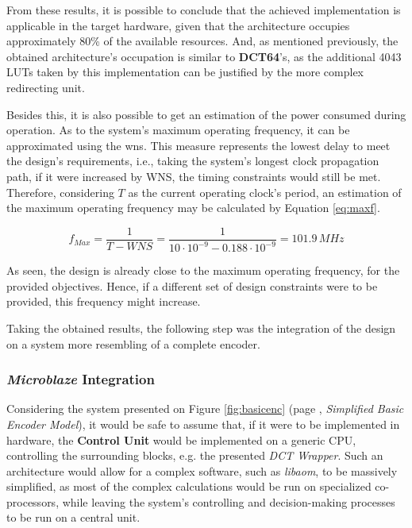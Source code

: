 From these results, it is possible to conclude that the achieved implementation is applicable in the target hardware, given that the architecture occupies approximately 80\% of the available resources. And, as mentioned previously, the obtained architecture's occupation is similar to \textbf{DCT64}'s, as the additional 4043 LUTs taken by this implementation can be justified by the more complex redirecting unit.

Besides this, it is also possible to get an estimation of the power consumed during operation. As to the system's maximum operating frequency, it can be approximated using the \gls{wns}. This measure represents the lowest delay to meet the design's requirements, i.e., taking the system's longest clock propagation path, if it were increased by WNS, the timing constraints would still be met. Therefore, considering $T$ as the current operating clock's period, an estimation of the maximum operating frequency may be calculated by Equation \ref{eq:maxf}.

\begin{equation} \label{eq:maxf}
    f_{Max} = \frac{1}{T-WNS} = \frac{1}{10\cdot 10^{-9} - 0.188\cdot 10^{-9}} = 101.9\,MHz
\end{equation}

As seen, the design is already close to the maximum operating frequency, for the provided objectives. Hence, if a different set of design constraints were to be provided, this frequency might increase.

Taking the obtained results, the following step was the integration of the design on a system more resembling of a complete encoder.

\subsubsection{\emph{Microblaze} Integration} \label{sec:microblaze}

Considering the system presented on Figure \ref{fig:basicenc} (page \pageref{fig:basicenc}, \emph{Simplified Basic Encoder Model}), it would be safe to assume that, if it were to be implemented in hardware, the \textbf{Control Unit} would be implemented on a generic CPU, controlling the surrounding blocks, e.g. the presented \emph{DCT Wrapper}. Such an architecture would allow for a complex software, such as \emph{libaom}, to be massively simplified, as most of the complex calculations would be run on specialized co-processors, while leaving the system's controlling and decision-making processes to be run on a central unit.

